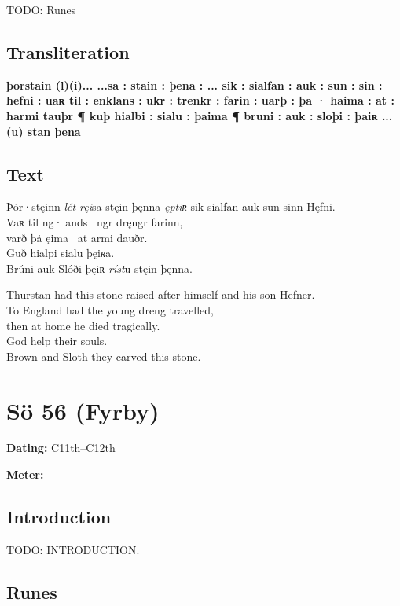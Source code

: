 TODO: Runes%

\subsection{Transliteration}

\textbf{þorstain (l)(i)... ...sa : stain : þena : ... sik : sialfan : auk : sun : sin : hefni : uaʀ til : enklans : ukr : trenkr : farin : uarþ : þa · haima : at : harmi tauþr ¶
kuþ hialbi : sialu : þaima ¶
bruni : auk : sloþi : þaiʀ ...(u) stan þena}

\subsection{Text}

\bpg\bpa[0]%
\startsub Þȯr·stęinn \emph{lét ręi}sa stęin þęnna \emph{ęptiʀ} sik sialfan auk sun si̇nn Hęfni.\endsub \\
Vaʀ til ng·lands \hld\ ngr dręngr farinn, \\
varð þȧ ęima \hld\ at armi dauðr. \\
Guð hialpi sialu þęi\emph{ʀ}a. \\
Brúni auk Slóði þęiʀ \emph{ríst}u stęin þęnna.\epa

\bpb Thurstan had this stone raised after himself and his son Hefner. \\
To England had the young dreng travelled, \\
then at home he died tragically. \\
God help their souls. \\
Brown and Sloth they carved this stone.\epb\epg

\sectionline\clearpage


\section{Sö 56 (Fyrby)}

\begin{flushright}%
\textbf{Dating:} C11th--C12th

\textbf{Meter:} \Fornyrdislag
\end{flushright}%

\subsection{Introduction}

TODO: INTRODUCTION.

\subsection{Runes}

